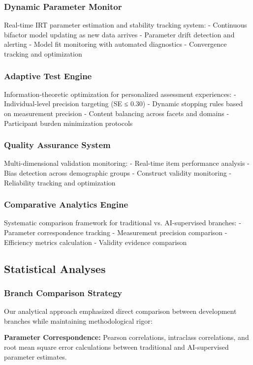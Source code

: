 \documentclass[12pt,a4paper]{article}
\begin{document}
\subsubsection{Dynamic Parameter Monitor}
Real-time IRT parameter estimation and stability tracking system:
- Continuous bifactor model updating as new data arrives
- Parameter drift detection and alerting
- Model fit monitoring with automated diagnostics
- Convergence tracking and optimization

\subsubsection{Adaptive Test Engine}
Information-theoretic optimization for personalized assessment experiences:
- Individual-level precision targeting (SE ≤ 0.30)
- Dynamic stopping rules based on measurement precision
- Content balancing across facets and domains
- Participant burden minimization protocols

\subsubsection{Quality Assurance System}
Multi-dimensional validation monitoring:
- Real-time item performance analysis
- Bias detection across demographic groups
- Construct validity monitoring
- Reliability tracking and optimization

\subsubsection{Comparative Analytics Engine}
Systematic comparison framework for traditional vs. AI-supervised branches:
- Parameter correspondence tracking
- Measurement precision comparison
- Efficiency metrics calculation
- Validity evidence comparison

\subsection{Statistical Analyses}

\subsubsection{Branch Comparison Strategy}

Our analytical approach emphasized direct comparison between development branches while maintaining methodological rigor:

\textbf{Parameter Correspondence:} Pearson correlations, intraclass correlations, and root mean square error calculations between traditional and AI-supervised parameter estimates.
\end{document}
